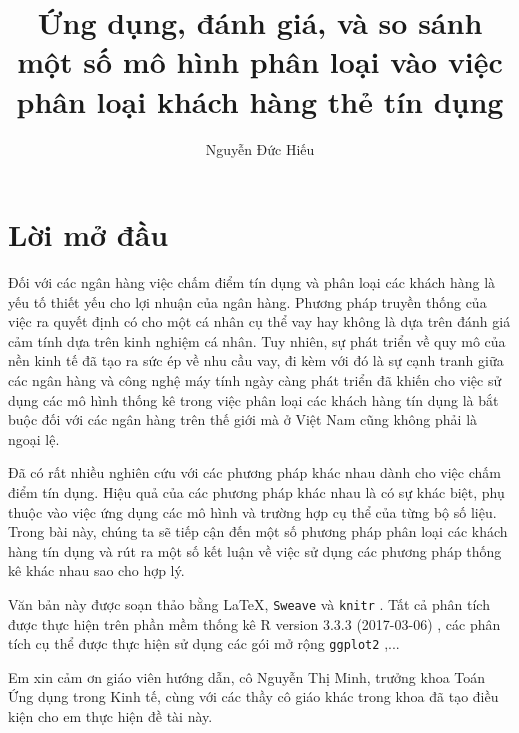 \documentclass[a4paper]{report}\usepackage[]{graphicx}\usepackage[]{color}
\title{Ứng dụng, đánh giá, và so sánh một số mô hình phân loại vào việc phân loại khách hàng thẻ tín dụng}\let\Title\@title
\author{Nguyễn Đức Hiếu}\let\Author\@author
\begin{document}



\chapter*{Lời mở đầu}

%
Đối với các ngân hàng việc chấm điểm tín dụng và phân loại các khách hàng là yếu tố thiết yếu cho lợi nhuận của ngân hàng.
%
Phương pháp truyền thống của việc ra quyết định có cho một cá nhân cụ thể vay hay không là dựa trên đánh giá cảm tính dựa trên kinh nghiệm cá nhân.
%
Tuy nhiên, sự phát triển về quy mô của nền kinh tế đã tạo ra sức ép về nhu cầu vay, đi kèm với đó là sự cạnh tranh giữa các ngân hàng và công nghệ máy tính ngày càng phát triển đã khiến cho việc sử dụng các mô hình thống kê trong việc phân loại các khách hàng tín dụng là bắt buộc đối với các ngân hàng trên thế giới mà ở Việt Nam cũng không phải là ngoại lệ.
%

Đã có rất nhiều nghiên cứu với các phương pháp khác nhau dành cho việc chấm điểm tín dụng.
Hiệu quả của các phương pháp khác nhau là có sự khác biệt, phụ thuộc vào việc ứng dụng các mô hình và trường hợp cụ thể của từng bộ số liệu.
Trong bài này, chúng ta sẽ tiếp cận đến một số phương pháp phân loại các khách hàng tín dụng và rút ra một số kết luận về việc sử dụng các phương pháp thống kê khác nhau sao cho hợp lý.

Văn bản này được soạn thảo bằng \LaTeX, \texttt{Sweave} và \texttt{knitr} 
\citep{r:knitr}. Tất cả phân tích được thực hiện trên phần mềm thống kê 
R version 3.3.3 (2017-03-06) \citep{r:rbase},  
các phân tích cụ thể được thực hiện sử dụng các gói mở rộng \texttt{ggplot2} \citep{r:ggplot2},...

Em xin cảm ơn giáo viên hướng dẫn, cô Nguyễn Thị Minh, trưởng khoa 
Toán Ứng dụng trong Kinh tế, cùng với các thầy cô giáo khác trong khoa đã tạo điều kiện cho em thực hiện đề tài này.

\clearpage\tableofcontents
{}

\listoftables
{}

\listoffigures
{}
\end{document}
